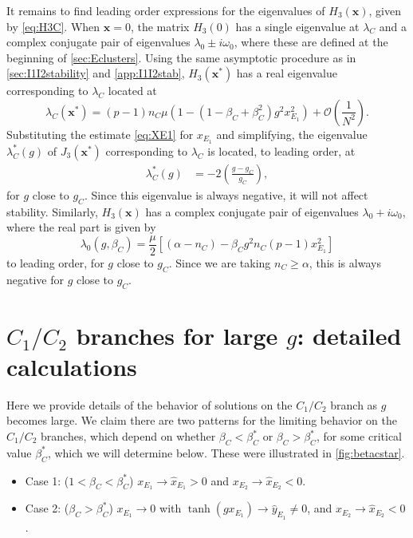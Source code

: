 \documentclass[reqno]{siamonline190516}
\newcommand{\xvec}{\mathbf{x}}
\begin{document}
It remains to find leading order expressions for the eigenvalues of $H_3(\xvec)$, given by \cref{eq:H3C}. When $\xvec = 0$, the matrix $H_3(0)$ has a single eigenvalue at $\lambda_C$ and a complex conjugate pair of eigenvalues $\lambda_0 \pm i \omega_0$, where these are defined at the beginning of \cref{sec:Eclusters}. Using the same asymptotic procedure as in \cref{sec:I1I2stability} and \cref{app:I1I2stab}, $H_3(\xvec^*)$ has a real eigenvalue corresponding to $\lambda_C$ located at
\[
\lambda_C(\xvec^*) = (p-1)n_C \mu  \left(1 - (1 - \beta_C+\beta_C^2)g^2 x_{E_1}^2 \right) + \mathcal{O}\left(\frac{1}{N^2} \right).
\]
Substituting the estimate \cref{eq:XE1} for $x_{E_1}$ and simplifying, the eigenvalue $\lambda_C^*(g)$ of $J_3(\xvec^*)$ corresponding to $\lambda_C$ is located, to leading order, at 
\begin{align*}
    \lambda_C^*(g) &= -2\left( \frac{g - g_C}{g_C} \right),
\end{align*}
for $g$ close to $g_C$. Since this eigenvalue is always negative, it will not affect stability. Similarly, $H_3(\xvec)$ has a complex conjugate pair of eigenvalues $\lambda_0 + i \omega_0$, where the real part is given by
\begin{equation*}
\lambda_0(g, \beta_C) = \frac{\mu}{2}\left[ (\alpha - n_C) - \beta_C g^2 n_C (p - 1) x_{E_1}^2 \right]
\end{equation*}
to leading order, for $g$ close to $g_C$. Since we are taking $n_C \geq \alpha$, this is always negative for $g$ close to $g_C$. 

\section{\texorpdfstring{$C_1/C_2$}{C1/C2} branches for large \texorpdfstring{$g$}{g}: detailed calculations}\label{app:C1C2_largeg} 
Here we provide details of the behavior of solutions on the $C_1/C_2$ branch as $g$ becomes large.  We claim there are two patterns for the limiting behavior on the $C_1/C_2$ branches, which depend on whether $\beta_C < \beta_C^*$ or $\beta_C > \beta_C^*$, for some critical value $\beta_C^*$, which we will determine below. These were illustrated in \cref{fig:betacstar}.\\
\begin{itemize}
    \item Case 1: ($1 < \beta_C < \beta_C^*$) $x_{E_1} \rightarrow \hat{x}_{E_1} > 0$ and $x_{E_2} \rightarrow \hat{x}_{E_2} < 0$. 
    \item Case 2: ($\beta_C > \beta_C^*$) $x_{E_1} \rightarrow 0$ with $\tanh(g x_{E_1}) \rightarrow \hat{y}_{E_1} \neq 0$, and $x_{E_2} \rightarrow \hat{x}_{E_2} < 0$.
\end{itemize}
\end{document}

